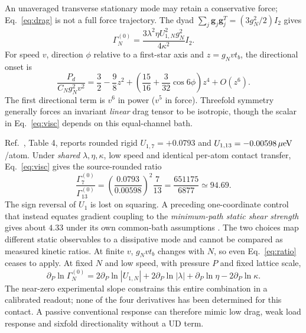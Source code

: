 \documentclass[9pt,a4paper,twocolumn]{extarticle}
\begin{document}
An unaveraged transverse stationary mode may retain a conservative force; Eq.~\eqref{eq:drag} is not a full force trajectory. The dyad $\sum_j\mathbf g_j\mathbf g_j^T=(3g_N^2/2)I_2$ gives
\begin{equation}
 \Gamma_N^{(0)}=\frac{3\lambda^2\eta U_{1,N}^2g_N^2}{4\kappa^2}I_2.\label{eq:visc}
\end{equation}
For speed $v$, direction $\phi$ relative to a first-star axis and $z=g_Nvt_b$, the directional onset is
\begin{equation}
 \frac{P_d}{C_Ng_N^2v^2}=\frac32-\frac98z^2+
 \left(\frac{15}{16}+\frac{3}{32}\cos6\phi\right)z^4+O(z^6).
 \label{eq:sixfold}
\end{equation}
The first directional term is $v^6$ in power ($v^5$ in force). Threefold symmetry generally forces an invariant \emph{linear} drag tensor to be isotropic, though the scalar in Eq.~\eqref{eq:visc} depends on this equal-channel bath.

Ref.~\cite{lebedeva}, Table 4, reports rounded rigid $U_{1,7}=+0.0793$ and $U_{1,13}=-0.00598\,\mu{\rm eV}$/atom. Under \emph{shared} $\lambda,\eta,\kappa$, low speed and identical per-atom contact transfer, Eq.~\eqref{eq:visc} gives the source-rounded ratio
\begin{equation}
 \frac{\Gamma_7^{(0)}}{\Gamma_{13}^{(0)}}=
 \left(\frac{0.0793}{0.00598}\right)^2\frac7{13}
 =\frac{651175}{6877}\simeq94.69.\label{eq:ratio}
\end{equation}
The sign reversal of $U_1$ is lost on squaring. A preceding one-coordinate control that instead equates gradient coupling to the \emph{minimum-path static shear strength} gives about $4.33$ under its own common-bath assumptions \cite{udphysics}. The two choices map different static observables to a dissipative mode and cannot be compared as measured kinetic ratios. At finite $v$, $g_Nvt_b$ changes with $N$, so even Eq.~\eqref{eq:ratio} ceases to apply. At fixed $N$ and low speed, with pressure $P$ and fixed lattice scale,
\begin{equation}
 \partial_P\ln\Gamma_N^{(0)}=2\partial_P\ln|U_{1,N}|+
 2\partial_P\ln|\lambda|+\partial_P\ln\eta-2\partial_P\ln\kappa.
 \label{eq:load}
\end{equation}
The near-zero experimental slope constrains this entire combination in a calibrated readout; none of the four derivatives has been determined for this contact. A passive conventional response can therefore mimic low drag, weak load response and sixfold directionality without a UD term.
\end{document}
